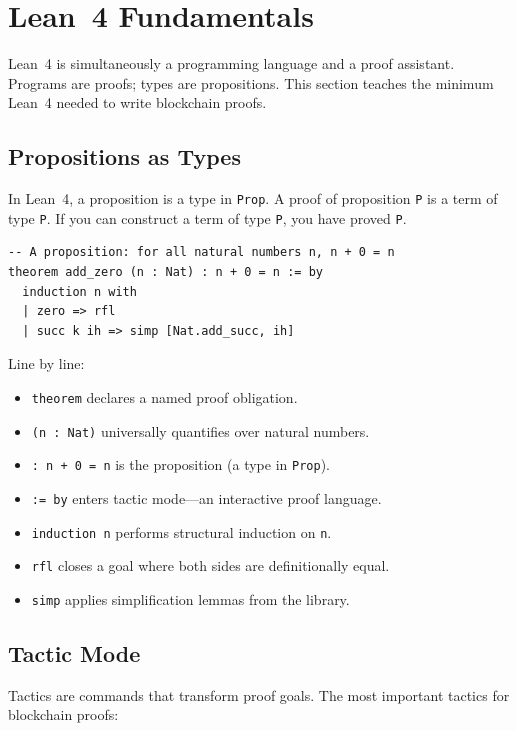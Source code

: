 \section{Lean~4 Fundamentals}


Lean~4 is simultaneously a programming language and a proof assistant. Programs are
proofs; types are propositions. This section teaches the minimum Lean~4 needed to write
blockchain proofs.

\subsection{Propositions as Types}

In Lean~4, a proposition is a type in \texttt{Prop}. A proof of proposition \texttt{P}
is a term of type \texttt{P}. If you can construct a term of type \texttt{P}, you have
proved \texttt{P}.

\begin{lstlisting}[language=Lean,caption={Basic propositions in Lean~4}]
-- A proposition: for all natural numbers n, n + 0 = n
theorem add_zero (n : Nat) : n + 0 = n := by
  induction n with
  | zero => rfl
  | succ k ih => simp [Nat.add_succ, ih]
\end{lstlisting}

Line by line:
\begin{itemize}[nosep]
  \item \texttt{theorem} declares a named proof obligation.
  \item \texttt{(n : Nat)} universally quantifies over natural numbers.
  \item \texttt{: n + 0 = n} is the proposition (a type in \texttt{Prop}).
  \item \texttt{:= by} enters tactic mode---an interactive proof language.
  \item \texttt{induction n} performs structural induction on \texttt{n}.
  \item \texttt{rfl} closes a goal where both sides are definitionally equal.
  \item \texttt{simp} applies simplification lemmas from the library.
\end{itemize}

\subsection{Tactic Mode}

Tactics are commands that transform proof goals. The most important tactics for blockchain
proofs:

